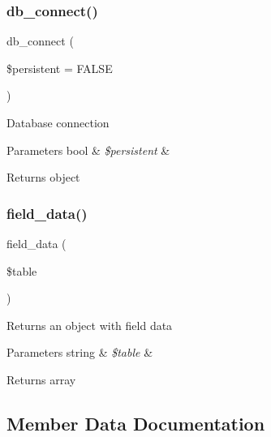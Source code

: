\subsubsection{\texorpdfstring{db\+\_\+connect()}{db\_connect()}}
{\footnotesize\ttfamily db\+\_\+connect (\begin{DoxyParamCaption}\item[{}]{\$persistent = {\ttfamily FALSE} }\end{DoxyParamCaption})}

Database connection


\begin{DoxyParams}[1]{Parameters}
bool & {\em \$persistent} & \\
\hline
\end{DoxyParams}
\begin{DoxyReturn}{Returns}
object 
\end{DoxyReturn}
\mbox{\label{class_c_i___d_b__pdo__sqlsrv__driver_a90355121e1ed009e0efdbd544ab56efa}} 
\subsubsection{\texorpdfstring{field\+\_\+data()}{field\_data()}}
{\footnotesize\ttfamily field\+\_\+data (\begin{DoxyParamCaption}\item[{}]{\$table }\end{DoxyParamCaption})}

Returns an object with field data


\begin{DoxyParams}[1]{Parameters}
string & {\em \$table} & \\
\hline
\end{DoxyParams}
\begin{DoxyReturn}{Returns}
array 
\end{DoxyReturn}


\subsection{Member Data Documentation}
\mbox{\label{class_c_i___d_b__pdo__sqlsrv__driver_a1dae2f0e9ad7299438a9976d6cdbf2ad}} 
